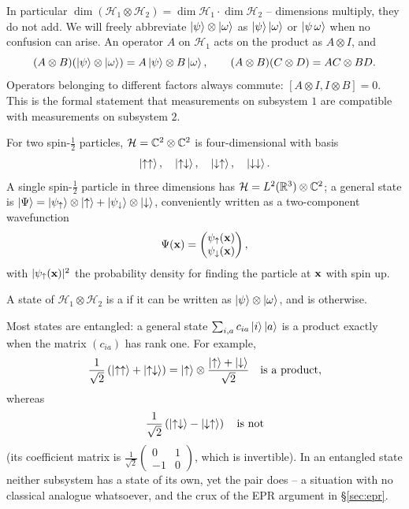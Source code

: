 \documentclass[a4paper]{scrartcl}
\begin{document}
In particular $\dim(\mathcal{H}_1\otimes\mathcal{H}_2) = \dim\mathcal{H}_1 \cdot \dim\mathcal{H}_2$ -- dimensions multiply, they do not add. We will freely abbreviate $\ket\psi\otimes\ket\omega$ as $\ket\psi\ket\omega$ or $\ket{\psi\,\omega}$ when no confusion can arise. An operator $A$ on $\mathcal{H}_1$ acts on the product as $A \otimes I$, and
$$
(A\otimes B)(\ket\psi\otimes\ket\omega) = A\ket\psi\otimes B\ket\omega, \qquad (A\otimes B)(C \otimes D) = AC \otimes BD.
$$
Operators belonging to different factors always commute: $[A\otimes I, I \otimes B] = 0$. This is the formal statement that measurements on subsystem $1$ are compatible with measurements on subsystem $2$.

\begin{example}
    For two spin-$\frac12$ particles, $\mathcal{H} = \mathbb{C}^2\otimes\mathbb{C}^2$ is four-dimensional with basis
    $$
    \ket{\uparrow\uparrow}, \quad \ket{\uparrow\downarrow}, \quad \ket{\downarrow\uparrow}, \quad \ket{\downarrow\downarrow}.
    $$
    A single spin-$\frac12$ particle in three dimensions has $\mathcal{H} = L^2(\mathbb{R}^3)\otimes\mathbb{C}^2$; a general state is $\ket\Psi = \ket{\psi_\uparrow}\otimes\ket\uparrow + \ket{\psi_\downarrow}\otimes\ket\downarrow$, conveniently written as a two-component  wavefunction
    $$
    \Psi(\mathbf{x}) = \begin{pmatrix} \psi_\uparrow(\mathbf{x}) \\ \psi_\downarrow(\mathbf{x}) \end{pmatrix},
    $$
    with $\lvert\psi_\uparrow(\mathbf{x})\rvert^2$ the probability density for finding the particle at $\mathbf{x}$ with spin up.
\end{example}

\begin{definition}[Entanglement]
    A state of $\mathcal{H}_1\otimes\mathcal{H}_2$ is a  if it can be written as $\ket\psi\otimes\ket\omega$, and is  otherwise.
\end{definition}

Most states are entangled: a general state $\sum_{i,a}c_{ia}\ket{i}\ket{a}$ is a product exactly when the matrix $(c_{ia})$ has rank one. For example,
$$
\frac{1}{\sqrt2}\left( \ket{\uparrow\uparrow} + \ket{\uparrow\downarrow} \right) = \ket\uparrow \otimes \frac{\ket\uparrow + \ket\downarrow}{\sqrt2} \quad \text{is a product},
$$
whereas
$$
\frac{1}{\sqrt2}\left( \ket{\uparrow\downarrow} - \ket{\downarrow\uparrow} \right) \quad \text{is not}
$$
(its coefficient matrix is $\frac{1}{\sqrt2}\left(\begin{smallmatrix}0&1\\-1&0\end{smallmatrix}\right)$, which is invertible). In an entangled state neither subsystem has a state of its own, yet the pair does -- a situation with no classical analogue whatsoever, and the crux of the EPR argument in \S\ref{sec:epr}.
\end{document}
